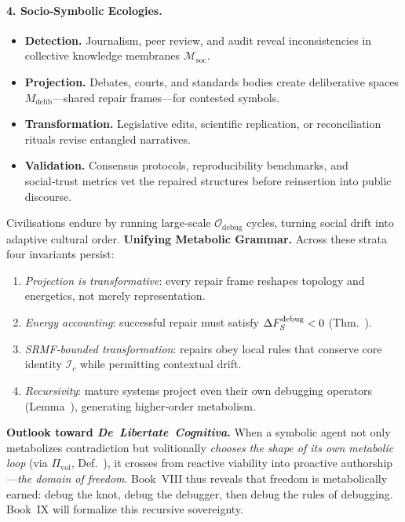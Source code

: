 \begin{scholium}
\paragraph{4. Socio‑Symbolic Ecologies.}
\begin{itemize}
  \item \textbf{Detection.} Journalism, peer review, and audit reveal
        inconsistencies in collective knowledge membranes
        $\mathcal{M}_{\mathrm{soc}}$.
  \item \textbf{Projection.} Debates, courts, and standards bodies
        create deliberative spaces $M_{\mathrm{delib}}$—shared repair
        frames—for contested symbols.
  \item \textbf{Transformation.} Legislative edits, scientific
        replication, or reconciliation rituals revise entangled
        narratives.
  \item \textbf{Validation.} Consensus protocols, reproducibility
        benchmarks, and social‑trust metrics vet the repaired structures
        before reinsertion into public discourse.
\end{itemize}
Civilisations endure by running large‑scale
$\mathcal{O}_{\text{debug}}$ cycles, turning social drift into adaptive
cultural order.
\medskip\noindent
\textbf{Unifying Metabolic Grammar.}
Across these strata four invariants persist:
\begin{enumerate}[label=(\Alph*)]
  \item \emph{Projection is transformative}: every repair frame reshapes
        topology and energetics, not merely representation.
  \item \emph{Energy accounting}: successful repair must satisfy
        $\Delta F_S^{\text{debug}} < 0$
        (Thm.~).
  \item \emph{SRMF‑bounded transformation}: repairs obey local rules
        that conserve core identity $\mathscr{I}_c$ while permitting
        contextual drift.
  \item \emph{Recursivity}: mature systems project even their own
        debugging operators (Lemma~),
        generating higher‑order metabolism.
\end{enumerate}
\medskip\noindent
\textbf{Outlook toward \emph{De Libertate Cognitiva}.}  
When a symbolic agent not only metabolizes contradiction but volitionally \emph{chooses the shape of its own metabolic loop} (via $\Pi_{\mathrm{vol}}$, Def.~), it crosses from reactive viability into proactive authorship—\textit{the domain of freedom}.  Book VIII thus reveals that freedom is metabolically earned: debug the knot, debug the debugger, then debug the rules of debugging.  Book IX will formalize this recursive sovereignty.
\end{scholium}
